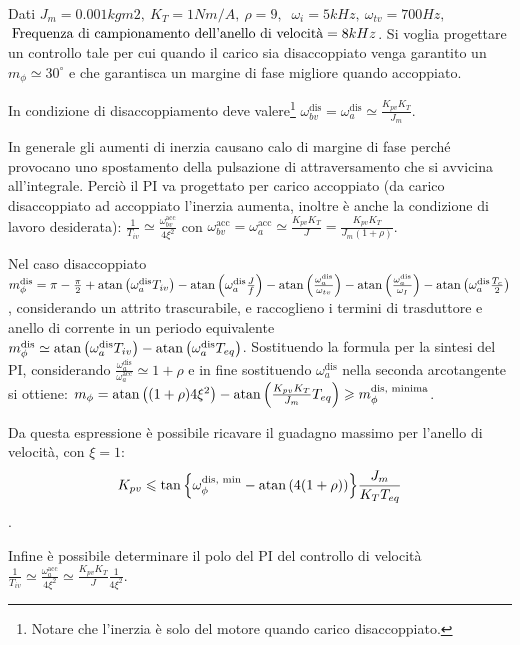 Dati \(J_m=0.001 kgm2, \ K_T=1 Nm/A, \ \rho = 9, \) \( \ \omega_i = 5 kHz, \ \omega_{tv}=700 Hz, \) \( \, \text{Frequenza di campionamento \allowbreak dell’anello di velocità} = 8 kHz\).
Si voglia progettare un controllo tale per cui quando il carico sia disaccoppiato venga garantito un \(m_\phi \simeq 30^\circ\) e che garantisca un margine di fase migliore quando accoppiato.

In condizione di disaccoppiamento deve valere\footnote{Notare che l'inerzia è solo del motore quando carico disaccoppiato.} \(\omega_{bv}^\text{dis} = \omega_a^\text{dis} \simeq \frac{K_{pv}K_T}{J_m}\).

In generale gli aumenti di inerzia causano calo di margine di fase perché provocano uno spostamento della pulsazione di attraversamento che si avvicina all'integrale. Perciò il PI va progettato per carico accoppiato (da carico disaccoppiato ad accoppiato l'inerzia aumenta, inoltre è anche la condizione di lavoro desiderata): \(\frac{1}{T_{iv}} \simeq \frac{\omega_{bv}^\text{acc}}{4\xi^2}\) con \(\omega_{bv}^\text{acc} = \omega_{a}^\text{acc} \simeq \frac{K_{pv}K_T}{J} = \frac{K_{pv}K_T}{J_m (1+\rho)}\).

Nel caso disaccoppiato \(m_\phi^\text{dis} = \pi - \frac{\pi}{2} + \operatorname{atan}\left( \omega_a^\text{dis} T_{iv} \right) - \operatorname{atan}\left( \omega_a^\text{dis} \frac{J}{f} \right) - \operatorname{atan}\left( \frac{\omega_a^\text{dis}}{\omega_{tv}} \right) - \operatorname{atan}\left( \frac{\omega_a^\text{dis}}{\omega_I} \right) - \operatorname{atan}\left( \omega_a^\text{dis} \frac{T_c}{2} \right) \), considerando un attrito trascurabile, e raccoglieno i termini di trasduttore e anello di corrente in un periodo equivalente \(m_\phi^\text{dis} \simeq \operatorname{atan}\left( \omega_a^\text{dis} T_{iv} \right) - \operatorname{atan}\left( \omega_a^\text{dis} T_{eq} \right) \). Sostituendo la formula per la sintesi del PI, considerando \(\frac{\omega_a^\text{dis}}{\omega_a^\text{acc}} \simeq 1+\rho\) e in fine sostituendo \(\omega_a^\text{dis}\) nella seconda arcotangente si ottiene: \(m_\phi = \operatorname{atan}\left( (1+\rho) 4 \xi^2 \right) - \operatorname{atan}\left( \frac{K_{pv}K_T}{J_m} T_{eq} \right) \geqslant m_\phi^\text{dis, minima}\).

Da questa espressione è possibile ricavare il guadagno massimo per l'anello di velocità, con \(\xi=1\): \[K_{pv} \leqslant \tan{\left\{\omega_\phi^\text{dis, min} - \operatorname{atan}\left( 4(1+\rho) \right) \right\}}\frac{J_m}{K_T T_{eq}} \].

Infine è possibile determinare il polo del PI del controllo di velocità \(\frac{1}{T_{iv}} \simeq \frac{\omega_a^\text{acc}}{4\xi^2} \simeq \frac{K_{pv}K_T}{J} \frac{1}{4\xi^2} \).

